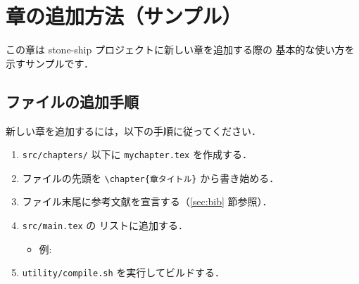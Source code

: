 
\chapter{章の追加方法（サンプル）}

この章は stone-ship プロジェクトに新しい章を追加する際の
基本的な使い方を示すサンプルです．

\section{ファイルの追加手順}

新しい章を追加するには，以下の手順に従ってください．

\begin{enumerate}
  \item \texttt{src/chapters/} 以下に \texttt{mychapter.tex} を作成する．
  \item ファイルの先頭を \verb|\chapter{章タイトル}| から書き始める．
  \item ファイル末尾に参考文献を宣言する（\ref{sec:bib} 節参照）．
  \item \texttt{src/main.tex} の \verb|| リストに追加する．
    \begin{itemize}
      \item 例: \verb||
    \end{itemize}
  \item \texttt{utility/compile.sh} を実行してビルドする．
\end{enumerate}

